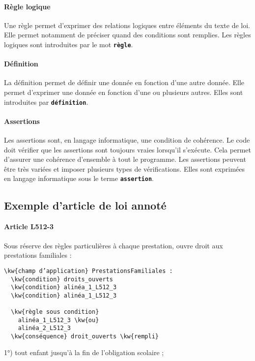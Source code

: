 \documentclass[12pt, french]{article}
\newcommand{\kw}[1]{\textbf{\textcolor{OliveGreen}{#1}}}
\newcommand{\inlinekw}[1]{\kw{\texttt{#1}}}
\begin{document}
\paragraph{Règle logique} Une règle permet d’exprimer des relations logiques entre éléments du texte de loi. Elle permet notamment de préciser quand des conditions sont remplies. Les règles logiques sont introduites par le mot \inlinekw{règle}.

\paragraph{Définition} La définition permet de définir une donnée en fonction d’une autre donnée. Elle permet d’exprimer une donnée en fonction d’une ou plusieurs autres. Elles sont introduites par \inlinekw{définition}.

\paragraph{Assertions} Les assertions sont, en langage informatique, une condition de cohérence. Le code doit vérifier que les assertions sont toujours vraies lorsqu’il s’exécute. Cela permet d’assurer une cohérence d’ensemble à tout le programme. Les assertions peuvent être très variées et imposer plusieurs types de vérifications. Elles sont exprimées en langage informatique sous le terme \inlinekw{assertion}.

\subsection{Exemple d'article de loi annoté}

\paragraph{Article L512-3} Sous réserve des règles particulières à chaque prestation, ouvre droit aux prestations familiales :

\begin{Verbatim}[commandchars=\\\{\}]
\kw{champ d’application} PrestationsFamiliales :
  \kw{condition} droits_ouverts
  \kw{condition} alinéa_1_L512_3
  \kw{condition} alinéa_1_L512_3

  \kw{règle sous condition}
    alinéa_1_L512_3 \kw{ou}
    alinéa_2_L512_3
  \kw{conséquence} droit_ouverts \kw{rempli}
\end{Verbatim}

1°) tout enfant jusqu’à la fin de l’obligation scolaire ;
\end{document}
